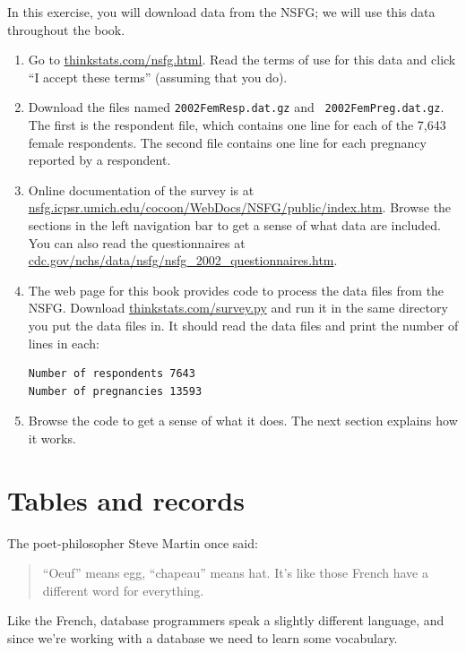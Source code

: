 \documentclass[12pt]{book}
\begin{document}
\begin{exercise}
In this exercise, you will download data from the NSFG; we will use
this data throughout the book.

\begin{enumerate}

\item Go to \url{thinkstats.com/nsfg.html}.  Read the terms of
use for this data and click ``I accept these terms'' (assuming that you do).

\item Download the files named {\tt 2002FemResp.dat.gz} and {\tt
  2002FemPreg.dat.gz}.  The first is the respondent file, which contains
  one line for each of the 7,643 female respondents.
  The second file contains one line for each pregnancy reported by a
  respondent.

\item Online documentation of the survey is at
  \url{nsfg.icpsr.umich.edu/cocoon/WebDocs/NSFG/public/index.htm}.
  Browse the sections in the left navigation bar to get a sense of
  what data are included.  You can also read the questionnaires
  at \url{cdc.gov/nchs/data/nsfg/nsfg_2002_questionnaires.htm}.

\item The web page for this book provides code to process the data
  files from the NSFG.  Download \url{thinkstats.com/survey.py}
  and run it in the same directory you put the data files in.  It
  should read the data files and print the number of lines in each:
%
\begin{verbatim}
Number of respondents 7643
Number of pregnancies 13593
\end{verbatim}

\item Browse the code to get a sense of what it does.  The next
section explains how it works.

\end{enumerate}

\end{exercise}

\section{Tables and records}

The poet-philosopher Steve Martin once said:
%
\begin{quote}
``Oeuf'' means egg, ``chapeau'' means hat.  It's like those French
  have a different word for everything.
\end{quote}
%
Like the French, database programmers speak a slightly
different language, and since we're working with a database we need
to learn some vocabulary.
\end{document}
